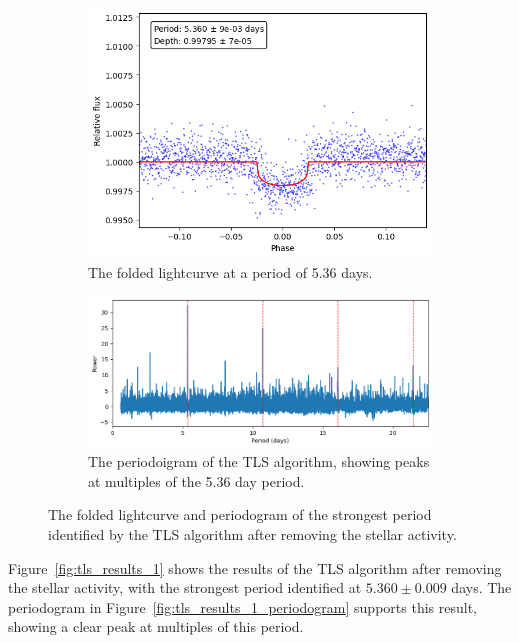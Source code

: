 \begin{figure}
\centering
\begin{subfigure}{0.5\textwidth}
    \centering
    \includegraphics[width=1\textwidth]{figures/tls_results_1}
    \caption{The folded lightcurve at a period of 5.36 days.}
    \label{fig:tls_results_1_folded}
\end{subfigure}%
\hfill
\begin{subfigure}{0.75\textwidth}
    \centering
    \includegraphics[width=1\textwidth]{./figures/tls_results_1_periodogram}
    \caption{The periodoigram of the TLS algorithm, showing peaks at multiples of the 5.36 day period.}
    \label{fig:tls_results_1_periodogram}
\end{subfigure}
\caption{The folded lightcurve and periodogram of the strongest period identified by the TLS algorithm after removing
the stellar activity.}
\label{fig:tls_results_1}
\end{figure}

Figure~\eqref{fig:tls_results_1} shows the results of the TLS algorithm after removing the stellar activity, with the strongest
period identified at $5.360 \pm 0.009$ days.
The periodogram in Figure~\eqref{fig:tls_results_1_periodogram} supports this result, showing a clear peak at multiples of this period.

